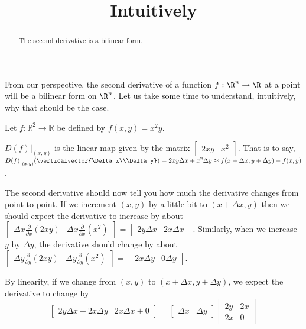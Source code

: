 \documentclass{ximera}
\title{Intuitively}
\begin{document}
\begin{abstract}
	The second derivative is a bilinear form.
\end{abstract}\maketitle
	
	From our perspective, the second derivative of a function $f: \R^n \to \R$ at a point will be a bilinear form on $\R^n$.  
	Let us take some time to understand, intuitively, why that should be the case.
	
	Let $f:\mathbb{R}^2 \to \mathbb{R}$ be defined by $f(x,y) = x^2y$.

$D(f)\big|_{(x,y)}$ is the linear map given by the matrix $\left[ \begin{matrix} 2xy&x^2\end{matrix} \right]$.  
That is to say, $D(f)\big|_{(x,y)}(\verticalvector{\Delta x\\\Delta y}) = 2xy\Delta x + x^2\Delta y \approx f(x+\Delta x,y+\Delta y) - f(x,y)$.  

The second derivative should now tell you how much the derivative changes from point to point.  
If we increment $(x,y)$ by a little bit to $(x+\Delta x,y)$ then we should expect the derivative to 
increase by about $\begin{bmatrix} \Delta x \frac{\partial}{ \partial x} ( 2xy) & \Delta x\frac{\partial}{\partial x}(x^2) \end{bmatrix} = \begin{bmatrix} 2y\Delta x&2x \Delta x\end{bmatrix}$.  
Similarly, when we increase $y$ by $\Delta y$, the derivative should change by about 
$\begin{bmatrix} \Delta y \frac{\partial}{ \partial y} ( 2xy) & \Delta y\frac{\partial}{\partial y}(x^2) \end{bmatrix} = \begin{bmatrix} 2x \Delta y&0\Delta y\end{bmatrix}$.

By linearity, if we change from $(x,y)$ to $(x+\Delta x,y+\Delta y)$, 
we expect the derivative to change by
 \[\begin{bmatrix} 2y\Delta x + 2x\Delta y & 2x\Delta x + 0 \end{bmatrix}  = \begin{bmatrix} \Delta x&\Delta y\end{bmatrix} \begin{bmatrix} 2y&2x\\2x&0\end{bmatrix} \]
\end{document}
